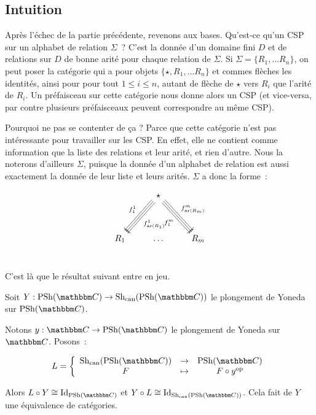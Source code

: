 
\subsection{Intuition}

Après l'échec de la partie précédente, revenons aux bases. Qu'est-ce qu'un CSP
sur un alphabet de relation $\Sigma$~? C'est la donnée d'un domaine fini $D$ et
de relations sur $D$ de bonne arité pour chaque relation de $\Sigma$. Si
$\Sigma = \{R_1, \dots R_n\}$, on peut poser la catégorie qui a pour objets
$\{\star, R_1, \dots R_n\}$ et commes flèches les identités, ainsi pour pour
tout $1\leq i\leq n$, autant de flèche de $\star$ vers $R_i$ que l'arité de
$R_i$. Un préfaisceau sur cette catégorie nous donne alors un CSP (et
vice-versa, par contre plusieurs préfaisceaux peuvent correspondre au même
CSP).

Pourquoi ne pas se contenter de ça ? Parce que cette catégorie n'est pas
intéressante pour travailler sur les CSP. En effet, elle ne contient comme
information que la liste des relations et leur arité, et rien d'autre. Nous la
noterons d'ailleurs $\Sigma$, puisque la donnée d'un alphabet de relation est
aussi exactement la donnée de leur liste et leurs arités. $\Sigma$ a donc la forme~:

\[\begin{tikzcd}
    & \star \arrow[ddl, shift right, swap, "f_1^1"]
            \arrow[ddl]
            \arrow[ddl, shift left, "f_{\text{ar}(R_1)}^1"]
            \arrow[ddr, shift right, swap, "f_1^m"]
            \arrow[ddr]
            \arrow[ddr, shift left, "f_{\text{ar}(R_m)}^m"]
            \\
    & & \\
    R_1 & \dots & R_m \\
\end{tikzcd}\]

C'est là que le résultat suivant entre en jeu.

\begin{prop}\label{canEq}
    Soit $Y : \psh(\C)\rightarrow\shc(\psh(\C))$ le plongement de Yoneda sur
    $\psh(\C)$.

    Notons $y : \C\rightarrow\psh(\C)$ le plongement de Yoneda sur $\C$. Posons~:

    \[L = \left\{\begin{array}{ccc}
             \shc(\psh(\C)) & \rightarrow & \psh(\C) \\
             F              & \mapsto     & F\circ y^\text{op} \\
    \end{array}\right.\]

    Alors $L\circ Y\cong\text{Id}_{\psh(\C)}$ et
    $Y\circ L\cong\text{Id}_{\shc(\psh(\C))}$. Cela fait de $Y$ une équivalence de
    catégories.
\end{prop}

